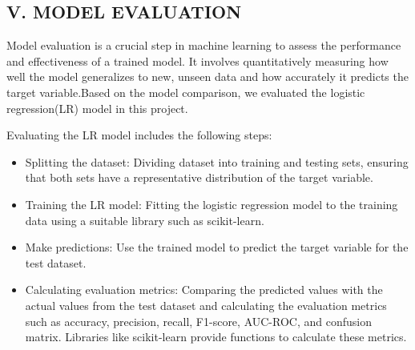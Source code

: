 \documentclass[conference]{IEEEtran}
\begin{document}
\subsection*{V. {\footnotesize MODEL EVALUATION}}
\par Model evaluation is a crucial step in machine learning to assess the performance and effectiveness of a trained model. It involves quantitatively measuring how well the model generalizes to new, unseen data and how accurately it predicts the target variable.Based on the model comparison, we evaluated the logistic regression(LR) model in this project.

\par Evaluating the LR model includes the following steps:
\begin{itemize}
\item Splitting the dataset: Dividing dataset into training and testing sets, ensuring that both sets have a representative distribution of the target variable.
\item Training the LR model: Fitting the logistic regression model to the training data using a suitable library such as scikit-learn.
\item Make predictions: Use the trained model to predict the target variable for the test dataset.
\item Calculating evaluation metrics: Comparing the predicted values with the actual values from the test dataset and calculating the evaluation metrics such as accuracy, precision, recall, F1-score, AUC-ROC, and confusion matrix. Libraries like scikit-learn provide functions to calculate these metrics.
\end{itemize}
\end{document}
